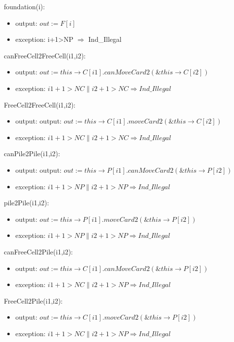 \documentclass[12pt]{article}
\begin{document}
\noindent foundation(i):
\begin{itemize}
\item output: $out := F[i]$
\item exception: i+1>NP $\Rightarrow$ Ind\_Illegal
\end{itemize}

\noindent canFreeCell2FreeCell(i1,i2):
\begin{itemize}
\item output: $out :=  this\rightarrow C[i1].canMoveCard2(\& this \rightarrow C[i2])$
\item exception: $i1+1>NC \| i2+1>NC \Rightarrow Ind\_Illegal$
\end{itemize}

\noindent FreeCell2FreeCell(i1,i2):
\begin{itemize}
\item output: output: $out :=  this\rightarrow C[i1].moveCard2(\& this \rightarrow C[i2])$
\item exception: $i1+1>NC \| i2+1>NC \Rightarrow Ind\_Illegal$
\end{itemize}

\noindent canPile2Pile(i1,i2):
\begin{itemize}
\item output: output: $out :=  this\rightarrow P[i1].canMoveCard2(\& this \rightarrow P[i2])$
\item exception: $i1+1>NP \| i2+1>NP \Rightarrow Ind\_Illegal$
\end{itemize}

\noindent pile2Pile(i1,i2):
\begin{itemize}
\item output: $out :=  this\rightarrow P[i1].moveCard2(\& this \rightarrow P[i2])$
\item exception: $i1+1>NP \| i2+1>NP \Rightarrow Ind\_Illegal$
\end{itemize}

\noindent canFreeCell2Pile(i1,i2):
\begin{itemize}
\item output: $out :=  this\rightarrow C[i1].canMoveCard2(\& this \rightarrow P[i2])$
\item exception: $i1+1>NC \| i2+1>NP \Rightarrow Ind\_Illegal$
\end{itemize}

\noindent FreeCell2Pile(i1,i2):
\begin{itemize}
\item output: $out :=  this\rightarrow C[i1].moveCard2(\& this \rightarrow P[i2])$
\item exception: $i1+1>NC \| i2+1>NP \Rightarrow Ind\_Illegal$
\end{itemize}
\end{document}
